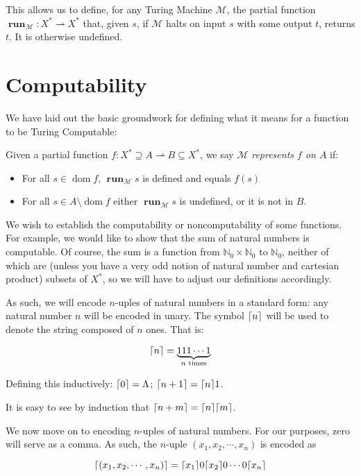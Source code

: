 \documentclass{article}
\newcommand{\N}{\mathbb{N}}
\newcommand{\M}{\mathcal{M}}
\DeclareMathOperator{\run}{\mathbf{run}}
\DeclareMathOperator{\dom}{\mathrm{dom}}
\DeclarePairedDelimiter{\ceil}{\lceil}{\rceil}
\begin{document}
	This allows us to define, for any Turing Machine $\M$, the partial function $\run_\M : X^* \rightharpoonup X^*$ that, given $s$, if $\M$ halts on input $s$ with some output $t$, returns $t$. It is otherwise undefined.
	
	\section{Computability}
	
	We have laid out the basic groundwork for defining what it means for a function to be Turing Computable:
	
	Given a partial function $f : X^* \supseteq A \rightharpoonup B \subseteq X^*$, we say $\M$ \emph{represents $f$ on $A$} if:
	
	\begin{itemize}
	
	\item For all $s \in \dom f$, $\run_\M s$ is defined and equals $f(s)$
	
	\item For all $s \in A \setminus \dom f$ either $\run_\M s$ is undefined, or it is not in $B$.
	
	\end{itemize}
	
	We wish to establish the computability or noncomputability of some functions. For example, we would like to show that the sum of natural numbers is computable. Of course, the sum is a function from $\N_0 \times \N_0$ to $\N_0$, neither of which are (unless you have a very odd notion of natural number and cartesian product) subsets of $X^*$, so we will have to adjust our definitions accordingly.
	
	As such, we will encode $n$-uples of natural numbers in a standard form: any natural number $n$ will be encoded in unary. The symbol $\ceil{n}$ will be used to denote the string composed of $n$ ones. That is:
	
	\[\ceil{n} = \underbrace{111\cdots1}_{n \text{ times}}\]
	
	Defining this inductively: $\ceil{0} = \Lambda$; $\ceil{n+1} = \ceil{n}1$.
	
	It is easy to see by induction that $\ceil{n+m} = \ceil{n}\ceil{m}$.
	
	We now move on to encoding $n$-uples of natural numbers. For our purposes, zero will serve as a comma. As such, the $n$-uple $(x_1, x_2, \cdots, x_n)$ is encoded as

	\[ \ceil{(x_1, x_2, \cdots, x_n)} = \ceil{x_1}0\ceil{x_2}0\cdots0\ceil{x_n} \]
	
\end{document}
